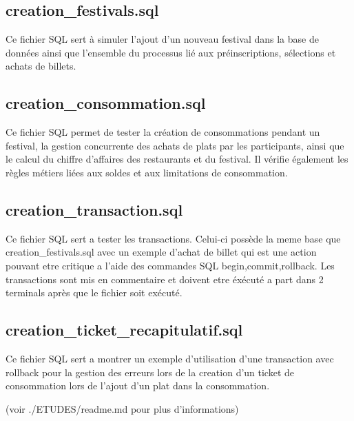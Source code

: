 \documentclass{article}
\begin{document}
\subsection{creation\_festivals.sql}

Ce fichier SQL sert à simuler l'ajout d'un nouveau festival dans la base de données ainsi que l'ensemble du processus lié aux préinscriptions, sélections et achats de billets.

\subsection{creation\_consommation.sql}
Ce fichier SQL permet de tester la création de consommations pendant un festival, la gestion concurrente des achats de plats par les participants, ainsi que le calcul du chiffre d'affaires des restaurants et du festival.
Il vérifie également les règles métiers liées aux soldes et aux limitations de consommation.

\subsection{creation\_transaction.sql}
Ce fichier SQL sert a tester les transactions.
Celui-ci possède la meme base que creation\_festivals.sql avec un exemple d'achat de billet qui est une action pouvant etre critique a l'aide des commandes SQL begin,commit,rollback.
Les transactions sont mis en commentaire et doivent etre éxécuté a part dans 2 terminals après que le fichier soit exécuté.

\subsection{creation\_ticket\_recapitulatif.sql} 
Ce fichier SQL sert a montrer un exemple d'utilisation d'une 
transaction avec rollback pour la gestion des erreurs lors de la creation 
d'un ticket de consommation lors de l'ajout d'un plat dans la consommation.

(voir ./ETUDES/readme.md pour plus d'informations)
\end{document}
